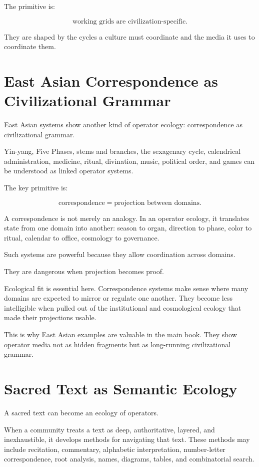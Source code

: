 \documentclass[11pt]{book}
\begin{document}
The primitive is:

\[
\text{working grids are civilization-specific}.
\]

They are shaped by the cycles a culture must coordinate and the media it uses to coordinate them.

\section{East Asian Correspondence as Civilizational Grammar}

East Asian systems show another kind of operator ecology: correspondence as civilizational grammar.

Yin-yang, Five Phases, stems and branches, the sexagenary cycle, calendrical administration, medicine, ritual, divination, music, political order, and games can be understood as linked operator systems.

The key primitive is:

\[
\text{correspondence} = \text{projection between domains}.
\]

A correspondence is not merely an analogy. In an operator ecology, it translates state from one domain into another: season to organ, direction to phase, color to ritual, calendar to office, cosmology to governance.

Such systems are powerful because they allow coordination across domains.

They are dangerous when projection becomes proof.

Ecological fit is essential here. Correspondence systems make sense where many domains are expected to mirror or regulate one another. They become less intelligible when pulled out of the institutional and cosmological ecology that made their projections usable.

This is why East Asian examples are valuable in the main book. They show operator media not as hidden fragments but as long-running civilizational grammar.

\section{Sacred Text as Semantic Ecology}

A sacred text can become an ecology of operators.

When a community treats a text as deep, authoritative, layered, and inexhaustible, it develops methods for navigating that text. These methods may include recitation, commentary, alphabetic interpretation, number-letter correspondence, root analysis, names, diagrams, tables, and combinatorial search.
\end{document}
